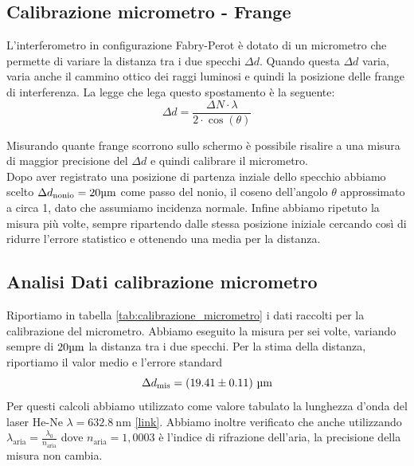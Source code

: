 \documentclass[letterpaper,12pt]{article}
\begin{document}
\subsection{Calibrazione micrometro - Frange}
L'interferometro in configurazione Fabry-Perot è dotato di un micrometro che permette 
di variare la distanza tra i due specchi $\Delta d$.
Quando questa $\Delta d$ varia, varia anche il cammino ottico dei raggi luminosi e quindi la posizione delle frange di interferenza.
La legge che lega questo spostamento è la seguente:
    \begin{equation}
        \Delta d = \frac{\Delta N \cdot \lambda}{2 \cdot \cos(\theta)}
        \label{eq:micrometro}
    \end{equation}

Misurando quante frange scorrono sullo schermo è possibile risalire a una misura di maggior precisione
del $\Delta d$ e quindi calibrare il micrometro.\\
Dopo aver registrato una posizione di partenza inziale dello specchio abbiamo scelto $\Delta d_\text{nonio} = 20\text{\SIUnitSymbolMicro m}$ come passo del nonio,
 il coseno dell'angolo $\theta$ approssimato a circa 1, dato che assumiamo incidenza normale.
Infine abbiamo ripetuto la misura più volte, sempre ripartendo
dalle stessa posizione iniziale cercando così di ridurre l'errore 
statistico e ottenendo una media per la distanza.

\subsection{Analisi Dati calibrazione micrometro}
Riportiamo in tabella \ref{tab:calibrazione_micrometro} i dati raccolti per la calibrazione del micrometro. 
Abbiamo eseguito la misura per sei volte, variando sempre di $20 \text{\SIUnitSymbolMicro m}$ la distanza tra i due specchi.
Per la stima della distanza, riportiamo il valor medio e l'errore standard 
$$\Delta d_\text{mis} = (19.41 \pm0.11)\ \text{\SIUnitSymbolMicro m} $$
Per questi calcoli abbiamo utilizzato come valore tabulato la lunghezza d'onda del laser He-Ne $\lambda = \SI{632.8}{\nano\meter}$ \href{https://www.pasco.com/products/lab-apparatus/light-and-optics/advanced-optics/os-9255}{[link]}.
Abbiamo inoltre verificato che anche utilizzando $\lambda_\text{aria} = \frac{\lambda_0}{n_\text{aria}}$ dove $n_\text{aria} = 1,0003$ 
è l'indice di rifrazione dell'aria, la precisione della misura non cambia.\\
\end{document}
